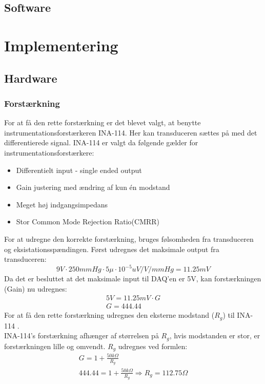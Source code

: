 \subsection{Software}

\section{Implementering}
\subsection{Hardware}
\subsubsection{Forstærkning}
For at få den rette forstærkning er det blevet valgt, at benytte instrumentationsforstærkeren INA-114. Her kan transduceren sættes på med det differentierede signal. INA-114 er valgt da følgende gælder\cite{Instrumentation} for instrumentationsforstærkere: 
\begin{itemize}
	\item Differentielt input - single ended output 
	\item Gain justering med ændring af kun én modstand 
	\item Meget høj indgangsimpedans 
	\item Stor Common Mode Rejection Ratio(CMRR)
\end{itemize}
For at udregne den korrekte forstærkning, bruges følsomheden fra transduceren og eksistationsspændingen.
Først udregnes det maksimale output fra transduceren:   
\begin{equation}
9V\cdot 250mmHg \cdot 5\mu\cdot 10^{-5} uV/V/mmHg  = 11.25mV
\end{equation} 
Da det er besluttet at det maksimale input til DAQ'en \cite{DSB} er 5V, kan forstærkningen (Gain) nu udregnes: 
\begin{equation}
\begin{split}
5V= 11.25mV \cdot G \\
G = 444.44
\end{split}
\end{equation}
For at få den rette forstærkning udregnes den eksterne modstand ($ R_g $) til INA-114 \cite{INA}.\\ 
INA-114's forstærkning afhænger af størrelsen på $ R_g $, hvis modstanden er stor, er forstærkningen lille og omvendt.  $ R_g $ udregnes ved formlen: 
\begin{equation}
\begin{split}
G=1+\frac{50k\Omega}{R_g}\\
444.44= 1+\frac{50k\Omega}{R_g} \Rightarrow R_g= 112.75 \Omega
\end{split}
\end{equation}
